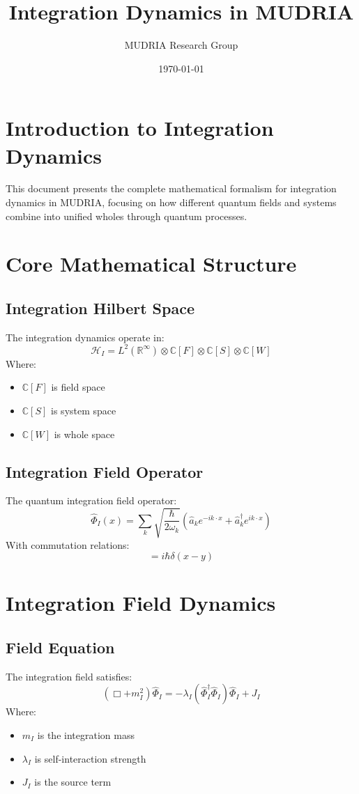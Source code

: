 \documentclass[12pt]{article}
\title{Integration Dynamics in MUDRIA}
\author{MUDRIA Research Group}
\date{\today}
\begin{document}
\maketitle
\section{Introduction to Integration Dynamics}
This document presents the complete mathematical formalism for integration dynamics in MUDRIA, focusing on how different quantum fields and systems combine into unified wholes through quantum processes.
\section{Core Mathematical Structure}
\subsection{Integration Hilbert Space}
The integration dynamics operate in:
\begin{equation}
\mathcal{H}_I = L^2(\mathbb{R}^\infty) \otimes \mathbb{C}[F] \otimes \mathbb{C}[S] \otimes \mathbb{C}[W]
\end{equation}
Where:
\begin{itemize}
\item $\mathbb{C}[F]$ is field space
\item $\mathbb{C}[S]$ is system space
\item $\mathbb{C}[W]$ is whole space
\end{itemize}
\subsection{Integration Field Operator}
The quantum integration field operator:
\begin{equation}
\hat{\Phi}_I(x) = \sum_k \sqrt{\frac{\hbar}{2\omega_k}}(\hat{a}_k e^{-ik\cdot x} + \hat{a}_k^\dagger e^{ik\cdot x})
\end{equation}
With commutation relations:
\begin{equation}
[\hat{\Phi}_I(x),\hat{\Pi}_I(y)] = i\hbar\delta(x-y)
\end{equation}
\section{Integration Field Dynamics}
\subsection{Field Equation}
The integration field satisfies:
\begin{equation}
(\Box + m_I^2)\hat{\Phi}_I = -\lambda_I(\hat{\Phi}_I^\dagger\hat{\Phi}_I)\hat{\Phi}_I + J_I
\end{equation}
Where:
\begin{itemize}
\item $m_I$ is the integration mass
\item $\lambda_I$ is self-interaction strength
\item $J_I$ is the source term
\end{itemize}
\end{document}

